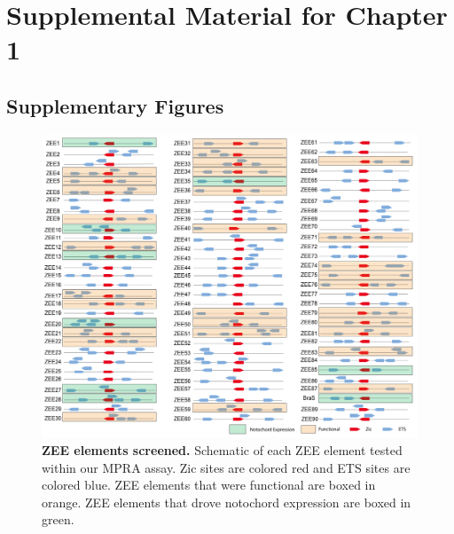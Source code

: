 \chapter{Supplemental Material for Chapter 1}

\section{Supplementary Figures}

\begin{figure}[h]
    \centering
    \includegraphics[scale=.2]{2_figures/FigS1_ZEE-Library.png}
    \caption[ZEE elements screened]{\textbf{ZEE elements screened.} Schematic of each ZEE element tested within our MPRA assay. Zic sites are colored red and ETS sites are colored blue. ZEE elements that were functional are boxed in orange. ZEE elements that drove notochord expression are boxed in green.}
    \label{fig:supplement zee elements screened}
\end{figure}

